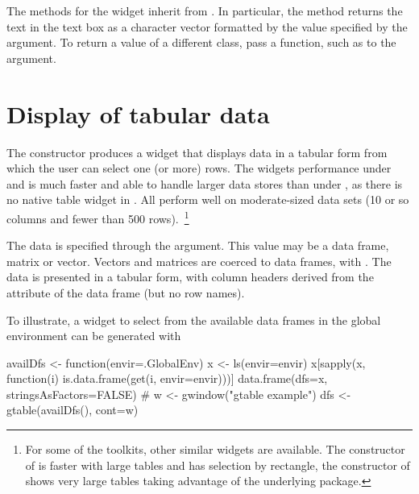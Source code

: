 The methods for the widget inherit from . In particular,
the  method returns the text in the text box
as a character vector formatted by the value specified by the
 argument. To return a value of a
different class, pass a function, such as  to the
 argument.




\section{Display of tabular data}
\label{sec:gWidgets-tabular-data-display}


The  constructor produces a widget that displays
data in a tabular form from which the user can select one (or more)
rows. The widgets performance under  and
 is much faster and able to handle larger data stores
than under , as there is no native table widget in
\tcltk. All perform well on moderate-sized data sets (10 or so columns
and fewer than 500 rows).~\footnote{For some of the toolkits, other
  similar widgets are available. The  constructor of
   is faster with large tables and has selection by
  rectangle, the  constructor of
   shows very large tables taking advantage of the
  underlying  package.}

The data is specified through the 
argument. This value may be a data frame, matrix or vector. Vectors and
matrices are coerced to data frames, with
.  The data is presented in a tabular
form, with column headers derived from the  attribute of
the data frame (but no row names).


To illustrate, a widget to select from the available data frames in
the global environment can be generated with
\begin{Schunk}
\begin{Sinput}
 availDfs <- function(envir=.GlobalEnv) {
   x <- ls(envir=envir)
   x[sapply(x, function(i) is.data.frame(get(i, envir=envir)))]
   data.frame(dfs=x, stringsAsFactors=FALSE)
 }
 #
 w <- gwindow("gtable example")
 dfs <- gtable(availDfs(), cont=w)
\end{Sinput}
\end{Schunk}

